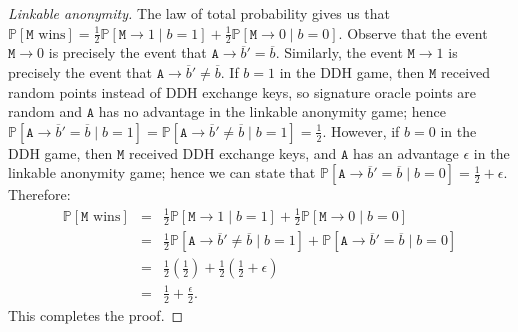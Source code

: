 \documentclass[draft]{llncs} %
\begin{document}
\begin{proof}[Linkable anonymity]
The law of total probability gives us that $\mathbb{P}\left[\texttt{M}\text{ wins}\right] = \frac{1}{2}\mathbb{P}\left[\texttt{M} \rightarrow 1 \mid b=1\right] + \frac{1}{2}\mathbb{P}\left[\texttt{M} \rightarrow 0 \mid b=0\right]$.
Observe that the event $\texttt{M} \rightarrow 0$ is precisely the event that $\texttt{A} \rightarrow \overline{b}' = \overline{b}$. Similarly, the event $\texttt{M} \rightarrow 1$ is precisely the event that $\texttt{A} \rightarrow \overline{b}' \neq \overline{b}$.
If $b = 1$ in the DDH game, then $\texttt{M}$ received random points instead of DDH exchange keys, so signature oracle points are random and $\texttt{A}$ has no advantage in the linkable anonymity game; hence $\mathbb{P}\left[\texttt{A} \rightarrow \overline{b}' = \overline{b} \mid b = 1\right] = \mathbb{P}\left[\texttt{A} \rightarrow \overline{b}' \neq \overline{b} \mid b = 1\right] = \frac{1}{2}$.
However, if $b = 0$ in the DDH game, then $\texttt{M}$ received DDH exchange keys, and $\texttt{A}$ has an advantage $\epsilon$ in the linkable anonymity game; hence we can state that $\mathbb{P}\left[\texttt{A} \rightarrow \overline{b}' = \overline{b} \mid b = 0\right] = \frac{1}{2} + \epsilon$.
Therefore:
\begin{eqnarray*}
\mathbb{P}\left[\texttt{M}\text{ wins}\right] &=& \frac{1}{2}\mathbb{P}\left[\texttt{M} \rightarrow 1 \mid b=1\right] + \frac{1}{2}\mathbb{P}\left[\texttt{M} \rightarrow 0 \mid b=0\right] \\
&=& \frac{1}{2}\mathbb{P}\left[\texttt{A} \rightarrow \overline{b}' \neq \overline{b} \mid b = 1\right] + \mathbb{P}\left[\texttt{A} \rightarrow \overline{b}' = \overline{b} \mid b = 0\right] \\
&=& \frac{1}{2}\left(\frac{1}{2}\right) + \frac{1}{2}\left(\frac{1}{2} + \epsilon\right) \\
&=& \frac{1}{2} + \frac{\epsilon}{2}.
\end{eqnarray*}
This completes the proof.
\end{proof}
\end{document}
